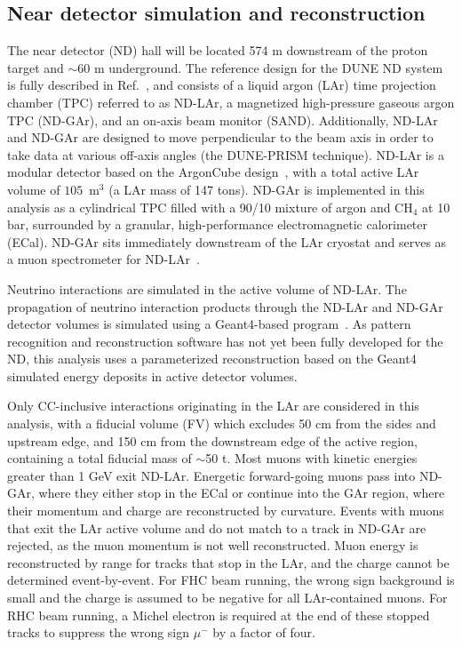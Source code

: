 \subsection{Near detector simulation and reconstruction}
The near detector (ND) hall will be located 574 m downstream of the proton target and $\sim$60 m underground. The reference design for the DUNE ND system is fully described in Ref.~\cite{AbedAbud:2021hpb}, and consists of a liquid argon (LAr) time projection chamber (TPC) referred to as ND-LAr, a magnetized high-pressure gaseous argon TPC (ND-GAr), and an on-axis beam monitor (SAND). Additionally, ND-LAr and ND-GAr are designed to move perpendicular to the beam axis in order to take data at various off-axis angles (the DUNE-PRISM technique). ND-LAr is a modular detector based on the ArgonCube design~\cite{argoncube_loi, Dwyer:2018phu, arclight}, with a total active LAr volume of $105$~m$^{3}$ (a LAr mass of 147 tons). ND-GAr is implemented in this analysis as a cylindrical TPC filled with a 90/10 mixture of argon and CH$_{4}$ at 10 bar, surrounded by a granular, high-performance electromagnetic calorimeter (ECal). ND-GAr sits immediately downstream of the LAr cryostat and serves as a muon spectrometer for ND-LAr~\cite{Emberger:2018pgr}.

Neutrino interactions are simulated in the active volume of ND-LAr. The propagation of neutrino interaction products through the ND-LAr and ND-GAr detector volumes is simulated using a Geant4-based program~\cite{Agostinelli:2002hh}. As pattern recognition and reconstruction software has not yet been fully developed for the ND, this analysis uses a parameterized reconstruction based on the Geant4 simulated energy deposits in active detector volumes.

Only CC-inclusive interactions originating in the LAr are considered in this analysis, with a fiducial volume (FV) which excludes 50 cm from the sides and upstream edge, and 150 cm from the downstream edge of the active region, containing a total fiducial mass of $\sim$50 t. Most muons with kinetic energies greater than 1 GeV exit ND-LAr. Energetic forward-going muons pass into ND-GAr, where they either stop in the ECal or continue into the GAr region, where their momentum and charge are reconstructed by curvature. Events with muons that exit the LAr active volume and do not match to a track in ND-GAr are rejected, as the muon momentum is not well reconstructed. Muon energy is reconstructed by range for tracks that stop in the LAr, and the charge cannot be determined event-by-event. For FHC beam running, the wrong sign background is small and the charge is assumed to be negative for all LAr-contained muons. For RHC beam running, a Michel electron is required at the end of these stopped tracks to suppress the wrong sign $\mu^-$ by a factor of four.

